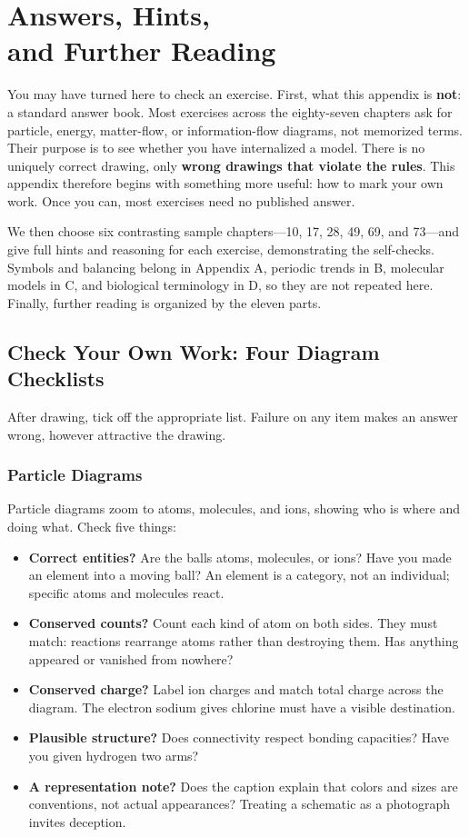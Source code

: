 \chapter[Answers, Hints, and Further Reading]{Answers, Hints,\protect\\ and Further Reading}

You may have turned here to check an exercise. First, what this appendix is \textbf{not}: a standard answer book. Most exercises across the eighty-seven chapters ask for particle, energy, matter-flow, or information-flow diagrams, not memorized terms. Their purpose is to see whether you have internalized a model. There is no uniquely correct drawing, only \textbf{wrong drawings that violate the rules}. This appendix therefore begins with something more useful: how to mark your own work. Once you can, most exercises need no published answer.

We then choose six contrasting sample chapters---10, 17, 28, 49, 69, and 73---and give full hints and reasoning for each exercise, demonstrating the self-checks. Symbols and balancing belong in Appendix A, periodic trends in B, molecular models in C, and biological terminology in D, so they are not repeated here. Finally, further reading is organized by the eleven parts.

\section{Check Your Own Work: Four Diagram Checklists}

After drawing, tick off the appropriate list. Failure on any item makes an answer wrong, however attractive the drawing.

\subsection{Particle Diagrams}

Particle diagrams zoom to atoms, molecules, and ions, showing who is where and doing what. Check five things:

\begin{itemize}[itemsep=2pt]
\item \textbf{Correct entities?} Are the balls atoms, molecules, or ions? Have you made an element into a moving ball? An element is a category, not an individual; specific atoms and molecules react.
\item \textbf{Conserved counts?} Count each kind of atom on both sides. They must match: reactions rearrange atoms rather than destroying them. Has anything appeared or vanished from nowhere?
\item \textbf{Conserved charge?} Label ion charges and match total charge across the diagram. The electron sodium gives chlorine must have a visible destination.
\item \textbf{Plausible structure?} Does connectivity respect bonding capacities? Have you given hydrogen two arms?
\item \textbf{A representation note?} Does the caption explain that colors and sizes are conventions, not actual appearances? Treating a schematic as a photograph invites deception.
\end{itemize}

